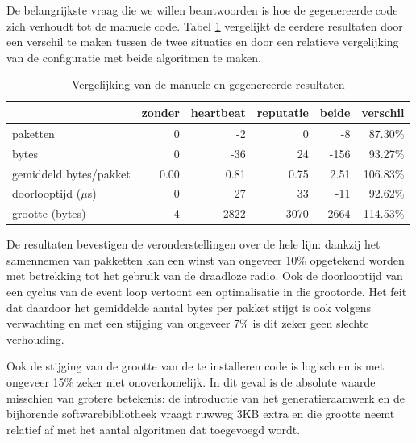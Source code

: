 De belangrijkste vraag die we willen beantwoorden is hoe de gegenereerde code
zich verhoudt tot de manuele code. Tabel \ref{tbl:comparison} vergelijkt de
eerdere resultaten door een verschil te maken tussen de twee situaties en door
een relatieve vergelijking van de configuratie met beide algoritmen te maken.

\begin{table}[H]
  \centering
  \begin{tabular}{l|r|rrrr}
  \hline
  & zonder & heartbeat & reputatie & beide & verschil\\
  \hline
  \hline

paketten               &  0    &   -2    &    0    &   -8    & \cellcolor{green!25} 87.30\% \\
bytes                  &  0    &  -36    &   24    & -156    & \cellcolor{green!25} 93.27\% \\
gemiddeld bytes/pakket &  0.00 &    0.81 &    0.75 &    2.51 & \cellcolor{red!25}  106.83\% \\
doorlooptijd ($\mu$s)  &  0    &   27    &   33    &  -11    & \cellcolor{green!25} 92.62\% \\
grootte (bytes)        & -4    & 2822    & 3070    & 2664    & \cellcolor{red!25}  114.53\% \\

  \hline
  \end{tabular}
  \caption{Vergelijking van de manuele en gegenereerde resultaten}
  \label{tbl:comparison}
\end{table}

De resultaten bevestigen de veronderstellingen over de hele lijn: dankzij het
samennemen van pakketten kan een winst van ongeveer 10\% opgetekend worden met
betrekking tot het gebruik van de draadloze radio. Ook de doorlooptijd van een
cyclus van de event loop vertoont een optimalisatie in die grootorde. Het feit
dat daardoor het gemiddelde aantal bytes per pakket stijgt is ook volgens
verwachting en met een stijging van ongeveer 7\% is dit zeker geen slechte
verhouding.

Ook de stijging van de grootte van de te installeren code is logisch en is met
ongeveer 15\% zeker niet onoverkomelijk. In dit geval is de absolute waarde
misschien van grotere betekenis: de introductie van het generatieraamwerk en de
bijhorende softwarebibliotheek vraagt ruwweg 3KB extra en die grootte neemt
relatief af met het aantal algoritmen dat toegevoegd wordt.

\vspace{-3mm}

